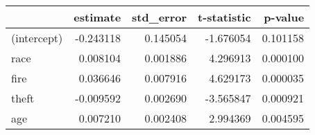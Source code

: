\begin{tabular}{lrrrr}
\toprule
{} &  estimate &  std\_error &  t-statistic &   p-value \\
\midrule
(intercept) & -0.243118 &   0.145054 &    -1.676054 &  0.101158 \\
race        &  0.008104 &   0.001886 &     4.296913 &  0.000100 \\
fire        &  0.036646 &   0.007916 &     4.629173 &  0.000035 \\
theft       & -0.009592 &   0.002690 &    -3.565847 &  0.000921 \\
age         &  0.007210 &   0.002408 &     2.994369 &  0.004595 \\
\bottomrule
\end{tabular}
